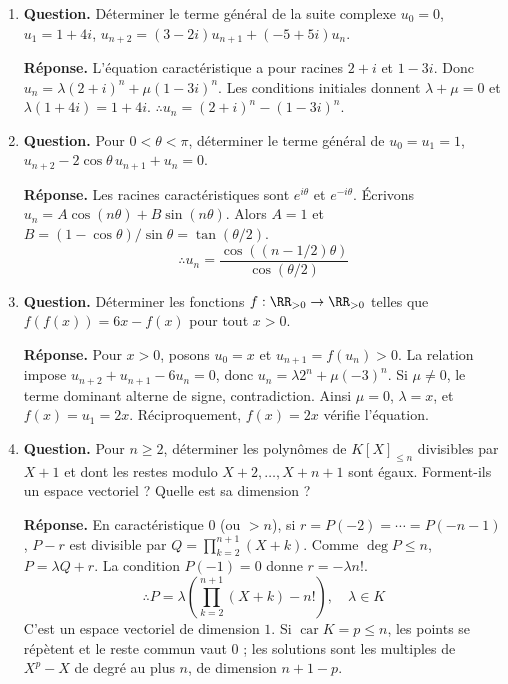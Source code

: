 \documentclass[12pt, a4paper]{article}
\begin{document}
\begin{enumerate}[label=6.\arabic*., start=105]
  \item \begin{minipage}[t]{\linewidth}\raggedright
\textbf{Question.} Déterminer le terme général de la suite complexe $u_0=0$, $u_1=1+4i$, $u_{n+2}=(3-2i)u_{n+1}+(-5+5i)u_n$.
\par\smallskip
\textbf{Réponse.} L'équation caractéristique a pour racines $2+i$ et $1-3i$.
    Donc $u_n=\lambda(2+i)^n+\mu(1-3i)^n$.
    Les conditions initiales donnent $\lambda+\mu=0$ et $\lambda(1+4i)=1+4i$.
    $\therefore u_n=(2+i)^n-(1-3i)^n$.
\end{minipage}

  \item \begin{minipage}[t]{\linewidth}\raggedright
\textbf{Question.} Pour $0<\theta<\pi$, déterminer le terme général de $u_0=u_1=1$, $u_{n+2}-2\cos\theta\,u_{n+1}+u_n=0$.
\par\smallskip
\textbf{Réponse.} Les racines caractéristiques sont $e^{i\theta}$ et $e^{-i\theta}$.
    Écrivons $u_n=A\cos(n\theta)+B\sin(n\theta)$.
    Alors $A=1$ et $B=(1-\cos\theta)/\sin\theta=\tan(\theta/2)$.
    \[
      \therefore u_n=\frac{\cos((n-1/2)\theta)}{\cos(\theta/2)}
    \]
\end{minipage}

  \item \begin{minipage}[t]{\linewidth}\raggedright
\textbf{Question.} Déterminer les fonctions $f:\RR_{>0}\to\RR_{>0}$ telles que $f(f(x))=6x-f(x)$ pour tout $x>0$.
\par\smallskip
\textbf{Réponse.} Pour $x>0$, posons $u_0=x$ et $u_{n+1}=f(u_n)>0$.
    La relation impose $u_{n+2}+u_{n+1}-6u_n=0$, donc $u_n=\lambda2^n+\mu(-3)^n$.
    Si $\mu\neq0$, le terme dominant alterne de signe, contradiction.
    Ainsi $\mu=0$, $\lambda=x$, et $f(x)=u_1=2x$.
    Réciproquement, $f(x)=2x$ vérifie l'équation.
\end{minipage}

  \item \begin{minipage}[t]{\linewidth}\raggedright
\textbf{Question.} Pour $n\geq2$, déterminer les polynômes de $K[X]_{\leq n}$ divisibles par $X+1$ et dont les restes modulo $X+2,\ldots,X+n+1$ sont égaux. Forment-ils un espace vectoriel ? Quelle est sa dimension ?
\par\smallskip
\textbf{Réponse.} En caractéristique $0$ (ou $>n$), si $r=P(-2)=\cdots=P(-n-1)$,
    $P-r$ est divisible par $Q=\prod_{k=2}^{n+1}(X+k)$.
    Comme $\deg P\leq n$, $P=\lambda Q+r$.
    La condition $P(-1)=0$ donne $r=-\lambda n!$.
    \[
      \therefore P=\lambda\left(\prod_{k=2}^{n+1}(X+k)-n!\right),\quad\lambda\in K
    \]
    C'est un espace vectoriel de dimension $1$.
    Si $\operatorname{car}K=p\leq n$, les points se répètent et le reste commun vaut $0$ ; les solutions sont les multiples de $X^p-X$ de degré au plus $n$, de dimension $n+1-p$.
\end{minipage}


\end{enumerate}
\end{document}
